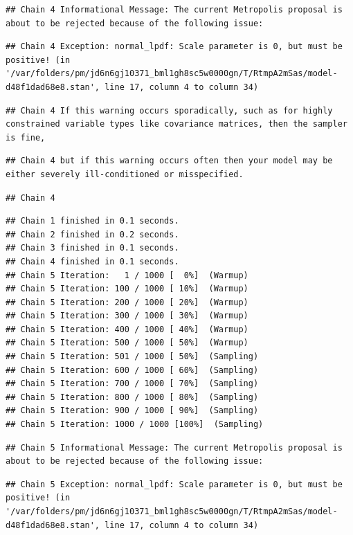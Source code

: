 \documentclass[
]{book}
\begin{document}
\begin{verbatim}
## Chain 4 Informational Message: The current Metropolis proposal is about to be rejected because of the following issue:
\end{verbatim}

\begin{verbatim}
## Chain 4 Exception: normal_lpdf: Scale parameter is 0, but must be positive! (in '/var/folders/pm/jd6n6gj10371_bml1gh8sc5w0000gn/T/RtmpA2mSas/model-d48f1dad68e8.stan', line 17, column 4 to column 34)
\end{verbatim}

\begin{verbatim}
## Chain 4 If this warning occurs sporadically, such as for highly constrained variable types like covariance matrices, then the sampler is fine,
\end{verbatim}

\begin{verbatim}
## Chain 4 but if this warning occurs often then your model may be either severely ill-conditioned or misspecified.
\end{verbatim}

\begin{verbatim}
## Chain 4
\end{verbatim}

\begin{verbatim}
## Chain 1 finished in 0.1 seconds.
## Chain 2 finished in 0.2 seconds.
## Chain 3 finished in 0.1 seconds.
## Chain 4 finished in 0.1 seconds.
## Chain 5 Iteration:   1 / 1000 [  0%]  (Warmup) 
## Chain 5 Iteration: 100 / 1000 [ 10%]  (Warmup) 
## Chain 5 Iteration: 200 / 1000 [ 20%]  (Warmup) 
## Chain 5 Iteration: 300 / 1000 [ 30%]  (Warmup) 
## Chain 5 Iteration: 400 / 1000 [ 40%]  (Warmup) 
## Chain 5 Iteration: 500 / 1000 [ 50%]  (Warmup) 
## Chain 5 Iteration: 501 / 1000 [ 50%]  (Sampling) 
## Chain 5 Iteration: 600 / 1000 [ 60%]  (Sampling) 
## Chain 5 Iteration: 700 / 1000 [ 70%]  (Sampling) 
## Chain 5 Iteration: 800 / 1000 [ 80%]  (Sampling) 
## Chain 5 Iteration: 900 / 1000 [ 90%]  (Sampling) 
## Chain 5 Iteration: 1000 / 1000 [100%]  (Sampling)
\end{verbatim}

\begin{verbatim}
## Chain 5 Informational Message: The current Metropolis proposal is about to be rejected because of the following issue:
\end{verbatim}

\begin{verbatim}
## Chain 5 Exception: normal_lpdf: Scale parameter is 0, but must be positive! (in '/var/folders/pm/jd6n6gj10371_bml1gh8sc5w0000gn/T/RtmpA2mSas/model-d48f1dad68e8.stan', line 17, column 4 to column 34)
\end{verbatim}
\end{document}
